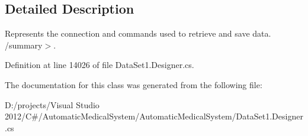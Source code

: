 \subsection{Detailed Description}
Represents the connection and commands used to retrieve and save data. /summary$>$. 

Definition at line 14026 of file DataSet1.Designer.cs.

The documentation for this class was generated from the following file:\begin{CompactItemize}
\item 
D:/projects/Visual Studio 2012/C\#/AutomaticMedicalSystem/AutomaticMedicalSystem/DataSet1.Designer.cs\end{CompactItemize}
